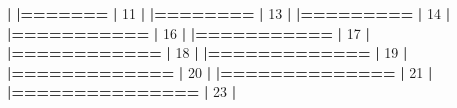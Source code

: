 \documentclass[]{book}
\newenvironment{Shaded}{\begin{snugshade}}{\end{snugshade}}
\newcommand{\DecValTok}[1]{\textcolor[rgb]{0.00,0.00,0.81}{#1}}
\newcommand{\ErrorTok}[1]{\textcolor[rgb]{0.64,0.00,0.00}{\textbf{#1}}}
\newcommand{\NormalTok}[1]{#1}
\newcommand{\OperatorTok}[1]{\textcolor[rgb]{0.81,0.36,0.00}{\textbf{#1}}}
\newcommand{\StringTok}[1]{\textcolor[rgb]{0.31,0.60,0.02}{#1}}
\begin{document}
\begin{Shaded}
\begin{Highlighting}[]
{{{{{{{{  \OperatorTok{|}\StringTok{                                                                       }
\StringTok{  }\ErrorTok{|=======}\StringTok{                                                          }\ErrorTok{|}\StringTok{  }\DecValTok{11}\NormalTok{%}
  \OperatorTok{|}\StringTok{                                                                       }
\StringTok{  }\ErrorTok{|========}\StringTok{                                                         }\ErrorTok{|}\StringTok{  }\DecValTok{13}\NormalTok{%}
  \OperatorTok{|}\StringTok{                                                                       }
\StringTok{  }\ErrorTok{|=========}\StringTok{                                                        }\ErrorTok{|}\StringTok{  }\DecValTok{14}\NormalTok{%}
  \OperatorTok{|}\StringTok{                                                                       }
\StringTok{  }\ErrorTok{|===========}\StringTok{                                                      }\ErrorTok{|}\StringTok{  }\DecValTok{16}\NormalTok{%}
  \OperatorTok{|}\StringTok{                                                                       }
\StringTok{  }\ErrorTok{|===========}\StringTok{                                                      }\ErrorTok{|}\StringTok{  }\DecValTok{17}\NormalTok{%}
  \OperatorTok{|}\StringTok{                                                                       }
\StringTok{  }\ErrorTok{|============}\StringTok{                                                     }\ErrorTok{|}\StringTok{  }\DecValTok{18}\NormalTok{%}
  \OperatorTok{|}\StringTok{                                                                       }
\StringTok{  }\ErrorTok{|=============}\StringTok{                                                    }\ErrorTok{|}\StringTok{  }\DecValTok{19}\NormalTok{%}
  \OperatorTok{|}\StringTok{                                                                       }
\StringTok{  }\ErrorTok{|=============}\StringTok{                                                    }\ErrorTok{|}\StringTok{  }\DecValTok{20}\NormalTok{%}
  \OperatorTok{|}\StringTok{                                                                       }
\StringTok{  }\ErrorTok{|==============}\StringTok{                                                   }\ErrorTok{|}\StringTok{  }\DecValTok{21}\NormalTok{%}
  \OperatorTok{|}\StringTok{                                                                       }
\StringTok{  }\ErrorTok{|===============}\StringTok{                                                  }\ErrorTok{|}\StringTok{  }\DecValTok{23}\NormalTok{%}
  \OperatorTok{|}\StringTok{                                                                       }
}}}}}}}}}}}}}}}}}}
\end{Highlighting}
\end{Shaded}
\end{document}
